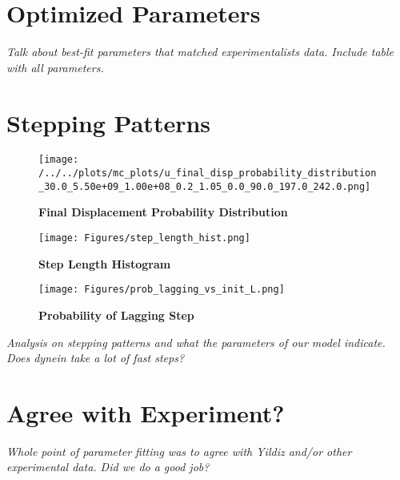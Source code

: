 \section{Optimized Parameters}
\textit{Talk about best-fit parameters that matched experimentalists data. Include table with all parameters.}

\section{Stepping Patterns}
\begin{figure}[H]
	\centering
	\texttt{[image: /../../plots/mc\_plots/u\_final\_disp\_probability\_distribution\_30.0\_5.50e+09\_1.00e+08\_0.2\_1.05\_0.0\_90.0\_197.0\_242.0.png]}
	\caption[Final Displacement Probability Distribution]{\textbf{Final Displacement Probability Distribution}}
	\label{fig:final_disp}
\end{figure}

\begin{figure}[H]
	\centering
	\texttt{[image: Figures/step\_length\_hist.png]}
	\caption[Step Length Histogram]{\textbf{Step Length Histogram}}
	\label{fig:step_length}
\end{figure}

\begin{figure}[H]
	\centering
	\texttt{[image: Figures/prob\_lagging\_vs\_init\_L.png]}
	\caption[Probability of Lagging Step]{\textbf{Probability of Lagging Step}}
	\label{fig:step_length}
\end{figure}

\textit{Analysis on stepping patterns and what the parameters of our model indicate. Does dynein take a lot of fast steps?}

\section{Agree with Experiment?}
\textit{Whole point of parameter fitting was to agree with Yildiz and/or other experimental data. Did we do a good job?}